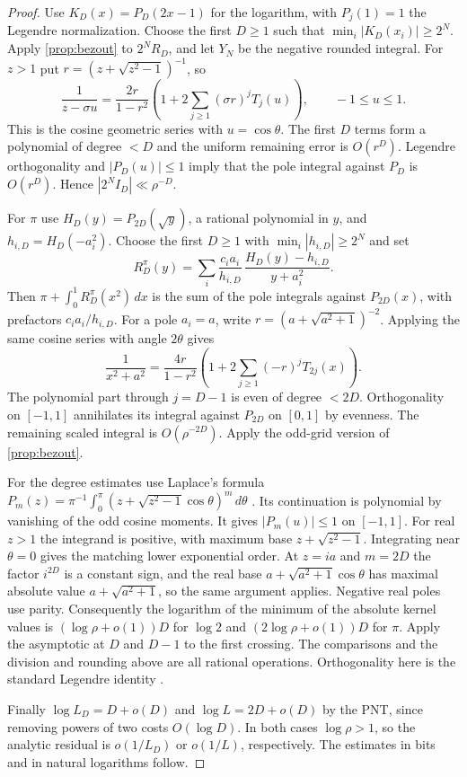 \documentclass[11pt]{article}
\begin{document}
\begin{proof}
Use $K_D(x)=P_D(2x-1)$ for the logarithm, with $P_j(1)=1$ the Legendre normalization. Choose the first $D\ge1$ such that $\min_i|K_D(x_i)|\ge2^N$. Apply \cref{prop:bezout} to $2^N R_D$, and let $Y_N$ be the negative rounded integral. For $z>1$ put $r=(z+\sqrt{z^2-1})^{-1}$, so
\[
 \frac{1}{z-\sigma u}=\frac{2r}{1-r^2}
        \left(1+2\sum_{j\ge1}(\sigma r)^j T_j(u)\right),\qquad -1\le u\le1.
\]
This is the cosine geometric series with $u=\cos\theta$. The first $D$ terms form a polynomial of degree $<D$ and the uniform remaining error is $O(r^D)$. Legendre orthogonality and $|P_D(u)|\le1$ imply that the pole integral against $P_D$ is $O(r^D)$. Hence $|2^N I_D|\ll\rho^{-D}$.

For $\pi$ use $H_D(y)=P_{2D}(\sqrt y)$, a rational polynomial in $y$, and $h_{i,D}=H_D(-a_i^2)$. Choose the first $D\ge1$ with $\min_i|h_{i,D}|\ge2^N$ and set
\[
 R_D^\pi(y)=\sum_i \frac{c_i a_i}{h_{i,D}}\,
              \frac{H_D(y)-h_{i,D}}{y+a_i^2}.
\]
Then $\pi+\int_0^1 R_D^\pi(x^2)\,dx$ is the sum of the pole integrals against $P_{2D}(x)$, with prefactors $c_i a_i/h_{i,D}$. For a pole $a_i=a$, write $r=(a+\sqrt{a^2+1})^{-2}$. Applying the same cosine series with angle $2\theta$ gives
\[
 \frac{1}{x^2+a^2}=\frac{4r}{1-r^2}
       \left(1+2\sum_{j\ge1}(-r)^j T_{2j}(x)\right).
\]
The polynomial part through $j=D-1$ is even of degree $<2D$. Orthogonality on $[-1,1]$ annihilates its integral against $P_{2D}$ on $[0,1]$ by evenness. The remaining scaled integral is $O(\rho^{-2D})$. Apply the odd-grid version of \cref{prop:bezout}.

For the degree estimates use Laplace's formula
$P_m(z)=\pi^{-1}\int_0^\pi(z+\sqrt{z^2-1}\cos\theta)^m\,d\theta$
\cite[Eq.~18.10.5]{dlmf}. Its continuation is polynomial by vanishing of the odd cosine moments. It gives $|P_m(u)|\le1$ on $[-1,1]$. For real $z>1$ the integrand is positive, with maximum base $z+\sqrt{z^2-1}$. Integrating near $\theta=0$ gives the matching lower exponential order. At $z=ia$ and $m=2D$ the factor $i^{2D}$ is a constant sign, and the real base $a+\sqrt{a^2+1}\cos\theta$ has maximal absolute value $a+\sqrt{a^2+1}$, so the same argument applies. Negative real poles use parity. Consequently the logarithm of the minimum of the absolute kernel values is $(\log\rho+o(1))D$ for $\log 2$ and $(2\log\rho+o(1))D$ for $\pi$. Apply the asymptotic at $D$ and $D-1$ to the first crossing. The comparisons and the division and rounding above are all rational operations. Orthogonality here is the standard Legendre identity \cite[Table~18.3.1]{dlmf}.

Finally $\log L_D=D+o(D)$ and $\log L=2D+o(D)$ by the PNT, since removing powers of two costs $O(\log D)$. In both cases $\log\rho>1$, so the analytic residual is $o(1/L_D)$ or $o(1/L)$, respectively. The estimates in bits and in natural logarithms follow.
\end{proof}
\end{document}
